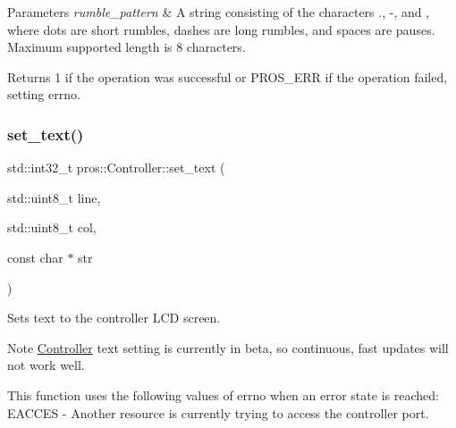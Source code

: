 \begin{DoxyParams}{Parameters}
{\em rumble\+\_\+pattern} & A string consisting of the characters \textquotesingle{}.\textquotesingle{}, \textquotesingle{}-\/\textquotesingle{}, and \textquotesingle{} \textquotesingle{}, where dots are short rumbles, dashes are long rumbles, and spaces are pauses. Maximum supported length is 8 characters.\\
\hline
\end{DoxyParams}
\begin{DoxyReturn}{Returns}
1 if the operation was successful or P\+R\+O\+S\+\_\+\+E\+RR if the operation failed, setting errno. 
\end{DoxyReturn}
\mbox{\label{classpros_1_1Controller_a2ec84a072d09a4bb39253956662604cd}} 
\subsubsection{\texorpdfstring{set\+\_\+text()}{set\_text()}\hspace{0.1cm}{\footnotesize\ttfamily [1/2]}}
{\footnotesize\ttfamily std\+::int32\+\_\+t pros\+::\+Controller\+::set\+\_\+text (\begin{DoxyParamCaption}\item[{std\+::uint8\+\_\+t}]{line,  }\item[{std\+::uint8\+\_\+t}]{col,  }\item[{const char $\ast$}]{str }\end{DoxyParamCaption})}

Sets text to the controller L\+CD screen.

\begin{DoxyNote}{Note}
\hyperlink{classpros_1_1Controller}{Controller} text setting is currently in beta, so continuous, fast updates will not work well.
\end{DoxyNote}
This function uses the following values of errno when an error state is reached\+: E\+A\+C\+C\+ES -\/ Another resource is currently trying to access the controller port.


